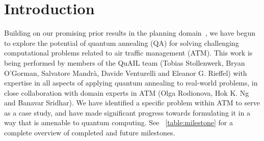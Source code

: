 \section*{Introduction}\label{sec:intro}
Building on our promising prior results in the planning domain~\cite{rieffel:15,venturelli:15},
we have begun to explore the potential of quantum annealing (QA) for solving challenging computational problems related to air traffic management (ATM)\cite{rodionova:16, rodionova:thesis15}.
This work is being performed by members of the QuAIL team (Tobias Stollenwerk, Bryan O'Gorman, Salvatore Mandr\`a, Davide Venturelli and Eleanor G. Rieffel) with expertise in all aspects of applying quantum annealing to real-world problems, in close collaboration with domain experts in ATM (Olga Rodionova, Hok K. Ng and Banavar Sridhar).
We have identified a specific problem within ATM to serve as a case study, and have made significant progress towards formulating it in a way that is amenable to quantum computing.
See \tablename~\ref{table:milestone} for a complete overview of completed and future milestones.


